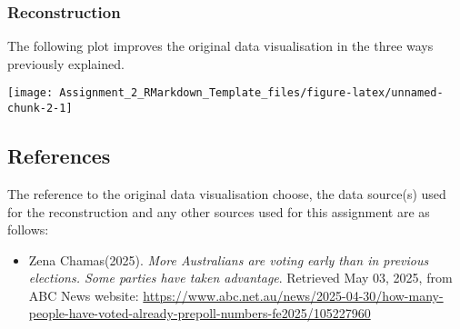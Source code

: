 \documentclass[
]{article}
\providecommand{\tightlist}{%
  \setlength{\itemsep}{0pt}\setlength{\parskip}{0pt}}
\begin{document}
\subsubsection{Reconstruction}\label{reconstruction}

The following plot improves the original data visualisation in the three
ways previously explained.

\begin{center}\texttt{[image: Assignment\_2\_RMarkdown\_Template\_files/figure-latex/unnamed-chunk-2-1]} \end{center}

\subsection{References}\label{references}

The reference to the original data visualisation choose, the data
source(s) used for the reconstruction and any other sources used for
this assignment are as follows:

\begin{itemize}
\tightlist
\item
  Zena Chamas(2025). \emph{More Australians are voting early than in
  previous elections. Some parties have taken advantage}. Retrieved May
  03, 2025, from ABC News website:
  \url{https://www.abc.net.au/news/2025-04-30/how-many-people-have-voted-already-prepoll-numbers-fe2025/105227960}
\end{itemize}
\end{document}
